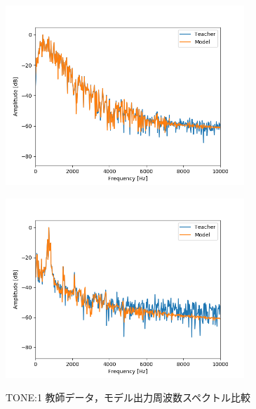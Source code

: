 \documentclass{jreport}		%
\begin{document}
\begin{figure}[htbp]
 \begin{minipage}{0.5\hsize}
 \begin{center}
  \includegraphics[width=90mm]{tone1_fft.png}
 \end{center}
 \label{fig:one}
 \end{minipage}
 \begin{minipage}{0.5\hsize}
 \begin{center}
  \includegraphics[width=90mm]{tone1_fft2.png}
 \end{center}
 \label{fig:two}
 \end{minipage}
 \caption{TONE:1 教師データ，モデル出力周波数スペクトル比較}
\end{figure}
\end{document}
